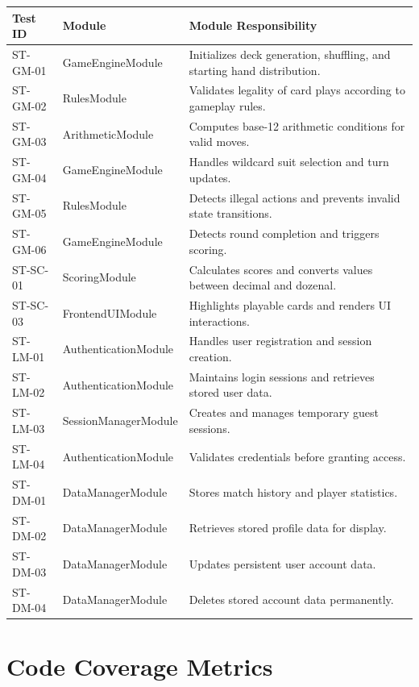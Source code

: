 \documentclass[12pt, titlepage]{article}
\begin{document}
      \renewcommand{\arraystretch}{1.0}

      \begin{tabular}{l l p{10cm}}
      \toprule
      \textbf{Test ID} & \textbf{Module} & \textbf{Module Responsibility}\\
      \midrule
      ST-GM-01 & GameEngineModule & Initializes deck generation, shuffling, and starting hand distribution.\\
      ST-GM-02 & RulesModule & Validates legality of card plays according to gameplay rules.\\
      ST-GM-03 & ArithmeticModule & Computes base-12 arithmetic conditions for valid moves.\\
      ST-GM-04 & GameEngineModule & Handles wildcard suit selection and turn updates.\\
      ST-GM-05 & RulesModule & Detects illegal actions and prevents invalid state transitions.\\
      ST-GM-06 & GameEngineModule & Detects round completion and triggers scoring.\\
      ST-SC-01 & ScoringModule & Calculates scores and converts values between decimal and dozenal.\\
      ST-SC-03 & FrontendUIModule & Highlights playable cards and renders UI interactions.\\
      ST-LM-01 & AuthenticationModule & Handles user registration and session creation.\\
      ST-LM-02 & AuthenticationModule & Maintains login sessions and retrieves stored user data.\\
      ST-LM-03 & SessionManagerModule & Creates and manages temporary guest sessions.\\
      ST-LM-04 & AuthenticationModule & Validates credentials before granting access.\\
      ST-DM-01 & DataManagerModule & Stores match history and player statistics.\\
      ST-DM-02 & DataManagerModule & Retrieves stored profile data for display.\\
      ST-DM-03 & DataManagerModule & Updates persistent user account data.\\
      ST-DM-04 & DataManagerModule & Deletes stored account data permanently.\\
      \bottomrule
      \end{tabular}


    \section{Code Coverage Metrics}
\end{document}
